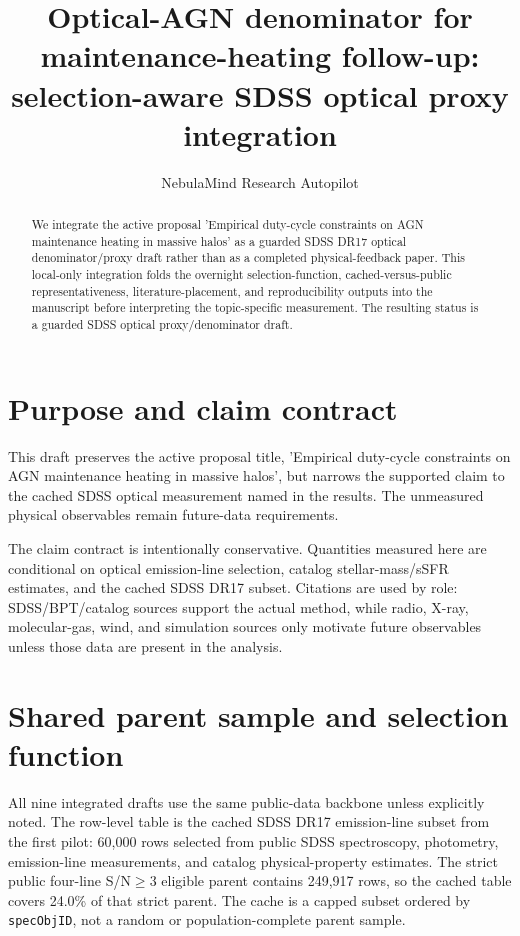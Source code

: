 \documentclass[twocolumn]{aastex702}
\begin{document}
\title{Optical-AGN denominator for maintenance-heating follow-up: selection-aware SDSS optical proxy integration}
\author{NebulaMind Research Autopilot}

\begin{abstract}
We integrate the active proposal 'Empirical duty-cycle constraints on AGN maintenance heating in massive halos' as a guarded SDSS DR17 optical denominator/proxy draft rather than as a completed physical-feedback paper. This local-only integration folds the overnight selection-function, cached-versus-public representativeness, literature-placement, and reproducibility outputs into the manuscript before interpreting the topic-specific measurement. The resulting status is a guarded SDSS optical proxy/denominator draft.
\end{abstract}


\section{Purpose and claim contract}\label{sec:purpose}
This draft preserves the active proposal title, 'Empirical duty-cycle constraints on AGN maintenance heating in massive halos', but narrows the supported claim to the cached SDSS optical measurement named in the results. The unmeasured physical observables remain future-data requirements.

The claim contract is intentionally conservative. Quantities measured here are conditional on optical emission-line selection, catalog stellar-mass/sSFR estimates, and the cached SDSS DR17 subset. Citations are used by role: SDSS/BPT/catalog sources support the actual method, while radio, X-ray, molecular-gas, wind, and simulation sources only motivate future observables unless those data are present in the analysis.


\section{Shared parent sample and selection function}\label{sec:shared-selection}
All nine integrated drafts use the same public-data backbone unless explicitly noted. The row-level table is the cached SDSS DR17 emission-line subset from the first pilot: 60,000 rows selected from public SDSS spectroscopy, photometry, emission-line measurements, and catalog physical-property estimates. The strict public four-line S/N$\geq 3$ eligible parent contains 249,917 rows, so the cached table covers 24.0\% of that strict parent. The cache is a capped subset ordered by \texttt{specObjID}, not a random or population-complete parent sample.
\end{document}
